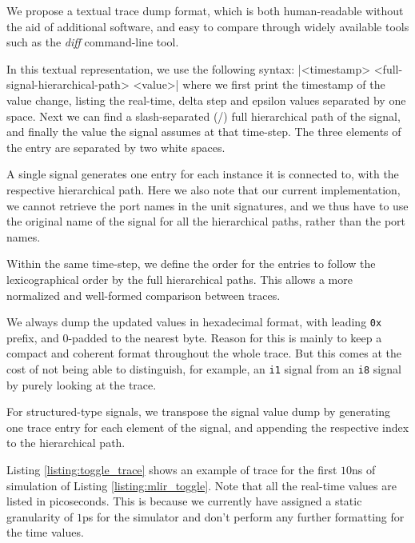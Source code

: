 We propose a textual trace dump format, which is both human-readable without the aid of additional software, and easy to compare through widely available tools such as the \textit{diff} command-line tool.


In this textual representation, we use the following syntax:
|<timestamp>  <full-signal-hierarchical-path>  <value>|
\noindent where we first print the timestamp of the value change, listing the real-time, delta step and epsilon values separated by one space. Next we can find a slash-separated (/) full hierarchical path of the signal, and finally the value the signal assumes at that time-step. The three elements of the entry are separated by two white spaces.

A single signal generates one entry for each instance it is connected to, with the respective hierarchical path. Here we also note that our current implementation, we cannot retrieve the port names in the unit signatures, and we thus have  to use the original name of the signal for all the hierarchical paths, rather than the port names.

Within the same time-step, we define the order for the entries to follow the lexicographical order by the full hierarchical paths. This allows a more normalized and well-formed comparison between traces.

We always dump the updated values in hexadecimal format, with leading \texttt{0x} prefix, and $0$-padded to the nearest byte. Reason for this is mainly to keep a compact and coherent format throughout the whole trace. But this comes at the cost of not being able to distinguish, for example, an \texttt{i1} signal from an \texttt{i8} signal by purely looking at the trace.

For structured-type signals, we transpose the signal value dump by generating one trace entry for each element of the signal, and appending the respective index to the hierarchical path.

Listing \ref{listing:toggle_trace} shows an example of trace for the first $10$ns of simulation of Listing \ref{listing:mlir_toggle}. Note that all the real-time values are listed in picoseconds. This is because we currently have assigned a static granularity of $1$ps for the simulator and don't perform any further formatting for the time values.


